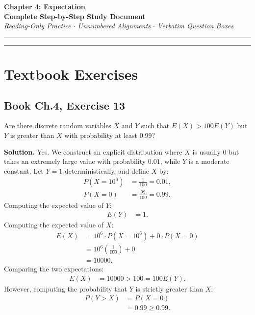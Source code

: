 \documentclass[11pt,a4paper]{article}
\begin{document}
\begin{center}
    {\LARGE \textbf{Chapter 4: Expectation}}\\[8pt]
    {\Large \textbf{Complete Step-by-Step Study Document}}\\[6pt]
    {\small \textit{Reading-Only Practice $\cdot$ Unnumbered Alignments $\cdot$ Verbatim Question Boxes}}
\end{center}

\vspace{5pt}
\hrule
\vspace{10pt}

\tableofcontents

\vspace{15pt}
\hrule
\vspace{15pt}

\section{Textbook Exercises}

\subsection{Book Ch.4, Exercise 13}
\begin{tcolorbox}[title={Book Ch.4, Exercise 13}]
Are there discrete random variables $X$ and $Y$ such that $E(X) > 100E(Y)$ but $Y$ is greater than $X$ with probability at least 0.99?
\end{tcolorbox}

\noindent \textbf{Solution.} Yes. We construct an explicit distribution where $X$ is usually $0$ but takes an extremely large value with probability $0.01$, while $Y$ is a moderate constant. Let $Y = 1$ deterministically, and define $X$ by:
\begin{align*}
P(X = 10^6) &= \frac{1}{100} = 0.01, \\
P(X = 0) &= \frac{99}{100} = 0.99.
\end{align*}
Computing the expected value of $Y$:
\begin{align*}
E(Y) &= 1.
\end{align*}
Computing the expected value of $X$:
\begin{align*}
E(X) &= 10^6 \cdot P(X = 10^6) + 0 \cdot P(X = 0) \\
&= 10^6 \left(\frac{1}{100}\right) + 0 \\
&= 10000.
\end{align*}
Comparing the two expectations:
\begin{align*}
E(X) &= 10000 > 100 = 100 E(Y).
\end{align*}
However, computing the probability that $Y$ is strictly greater than $X$:
\begin{align*}
P(Y > X) &= P(X = 0) \\
&= 0.99 \ge 0.99.
\end{align*}
\end{document}
